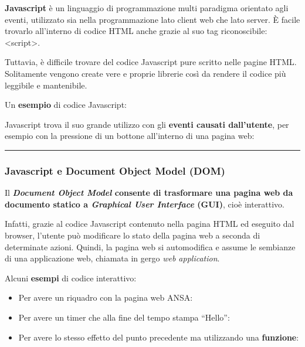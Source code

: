 \documentclass[a4paper]{article}
\newcommand{\longline}{\noindent\rule{\textwidth}{0.4pt}}
\newcommand{\dquotes}[1]{``#1''}
\begin{document}
	\textcolor{Red3}{\textbf{Javascript}} è un linguaggio di programmazione multi paradigma orientato agli eventi, utilizzato sia nella programmazione lato client web che lato server. È facile trovarlo all'interno di codice HTML anche grazie al suo tag riconoscibile: \textsf{<script>}.
	
	Tuttavia, è difficile trovare del codice Javascript pure scritto nelle pagine HTML. Solitamente vengono create vere e proprie librerie così da rendere il codice più leggibile e mantenibile.\newline
	
	\noindent
	Un \textcolor{Green4}{\textbf{esempio}} di codice Javascript:
	\newpage
	
	\noindent
	Javascript trova il suo grande utilizzo con gli \textbf{eventi causati dall'utente}, per esempio con la pressione di un bottone all'interno di una pagina web:
	
	
	\longline
	
	\subsubsection{Javascript e Document Object Model (DOM)}
	
	Il \textbf{\emph{Document Object Model} consente di trasformare una pagina web da documento statico a \emph{Graphical User Interface} (GUI)}, cioè interattivo.
	
	Infatti, grazie al codice Javascript contenuto nella pagina HTML ed eseguito dal browser, l'utente può modificare lo stato della pagina web a seconda di determinate azioni. Quindi, la pagina web si automodifica e assume le sembianze di una applicazione web, chiamata in gergo \emph{web application}.\newline
	
	\noindent
	Alcuni \textcolor{Green4}{\textbf{esempi}} di codice interattivo:
	\begin{itemize}
		\item Per avere un riquadro con la pagina web ANSA:
		\newpage
		
		\item Per avere un timer che alla fine del tempo stampa \dquotes{Hello}:
		
		
		\item Per avere lo stesso effetto del punto precedente ma utilizzando una \textbf{funzione}:
		
	\end{itemize}\newpage
	
\end{document}
